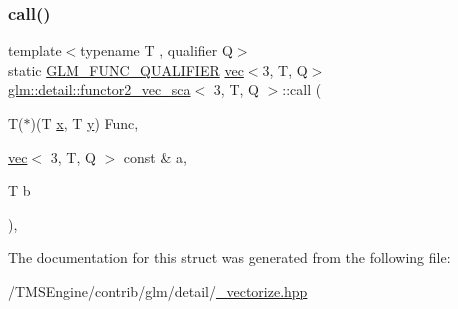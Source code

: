 \subsubsection{\texorpdfstring{call()}{call()}}
{\footnotesize\ttfamily template$<$typename T , qualifier Q$>$ \\
static \hyperlink{setup_8hpp_a33fdea6f91c5f834105f7415e2a64407}{G\+L\+M\+\_\+\+F\+U\+N\+C\+\_\+\+Q\+U\+A\+L\+I\+F\+I\+ER} \hyperlink{structglm_1_1vec}{vec}$<$3, T, Q$>$ \hyperlink{structglm_1_1detail_1_1functor2__vec__sca}{glm\+::detail\+::functor2\+\_\+vec\+\_\+sca}$<$ 3, T, Q $>$\+::call (\begin{DoxyParamCaption}\item[{T($\ast$)(T \hyperlink{_s_d_l__opengl_8h_ad0e63d0edcdbd3d79554076bf309fd47}{x}, T \hyperlink{_s_d_l__opengl_8h_a1675d9d7bb68e1657ff028643b4037e3}{y})}]{Func,  }\item[{\hyperlink{structglm_1_1vec}{vec}$<$ 3, T, Q $>$ const \&}]{a,  }\item[{T}]{b }\end{DoxyParamCaption})\hspace{0.3cm}{\ttfamily [inline]}, {\ttfamily [static]}}



The documentation for this struct was generated from the following file\+:\begin{DoxyCompactItemize}
\item 
/\+T\+M\+S\+Engine/contrib/glm/detail/\hyperlink{__vectorize_8hpp}{\+\_\+vectorize.\+hpp}\end{DoxyCompactItemize}
